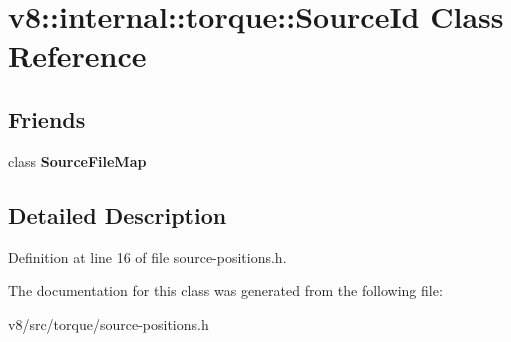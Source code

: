 \hypertarget{classv8_1_1internal_1_1torque_1_1SourceId}{}\section{v8\+:\+:internal\+:\+:torque\+:\+:Source\+Id Class Reference}
\label{classv8_1_1internal_1_1torque_1_1SourceId}
\subsection*{Friends}
\begin{DoxyCompactItemize}
\item 
\mbox{\label{classv8_1_1internal_1_1torque_1_1SourceId_ab3ae3f3ca49c2591f2339c3d2b03aa1c}} 
class {\bfseries Source\+File\+Map}
\end{DoxyCompactItemize}


\subsection{Detailed Description}


Definition at line 16 of file source-\/positions.\+h.



The documentation for this class was generated from the following file\+:\begin{DoxyCompactItemize}
\item 
v8/src/torque/source-\/positions.\+h\end{DoxyCompactItemize}
